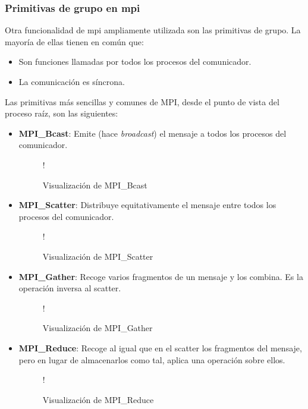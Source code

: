 \subsubsection{Primitivas de grupo en \acrshort{mpi}}
Otra funcionalidad de \acrshort{mpi} ampliamente utilizada son las primitivas de grupo. La mayoría de ellas tienen en común que:
\begin{itemize}
  \item Son funciones llamadas por todos los procesos del comunicador.
  \item La comunicación es síncrona.
\end{itemize}

Las primitivas más sencillas y comunes de MPI, desde el punto de vista del proceso raíz, son las siguientes:
\begin{itemize}
  \item \textbf{MPI\_Bcast}: Emite (hace \textit{broadcast}) el mensaje a todos los procesos del comunicador.
  
  \begin{figure}[H]
    \vspace*{0.5cm}
    \centering
     {!} {
    
    }
    \caption{Visualización de MPI\_Bcast \cite{cheung_mpi}}
    \label{fig:mpi_bcast}
  \end{figure}

  \item \textbf{MPI\_Scatter}: Distribuye equitativamente el mensaje entre todos los procesos del comunicador.

  \begin{figure}[H]
    \vspace*{0.5cm}
    \centering
     {!} {
    
    }
    \caption{Visualización de MPI\_Scatter \cite{cheung_mpi}}
    \label{fig:mpi_scatter}
  \end{figure}

  \item \textbf{MPI\_Gather}: Recoge varios fragmentos de un mensaje y los combina. Es la operación inversa al scatter.

  \begin{figure}[H]
    \vspace*{0.5cm}
    \centering
     {!} {
    
    }
    \caption{Visualización de MPI\_Gather \cite{cheung_mpi}}
    \label{fig:mpi_gather}
  \end{figure}

  \item \textbf{MPI\_Reduce}: Recoge al igual que en el scatter los fragmentos del mensaje, pero en lugar de almacenarlos como tal, aplica una operación sobre ellos.

  \begin{figure}[H]
    \vspace*{0.5cm}
    \centering
     {!} {
    
    }
    \caption{Visualización de MPI\_Reduce \cite{cheung_mpi}}
    \label{fig:mpi_reduce}
  \end{figure}

\end{itemize}

